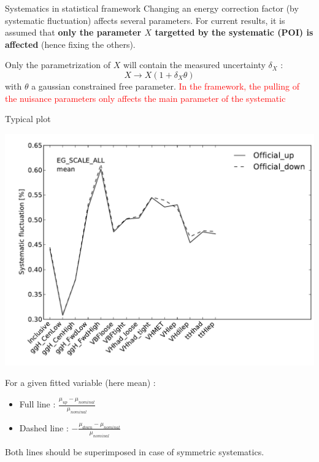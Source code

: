 \begin{frame}{Systematics in statistical framework}
  Changing an energy correction factor (by systematic fluctuation) affects several parameters.
  For current results, it is assumed that {\bf only the parameter $X$ targetted by the systematic (POI) is affected} (hence fixing the others).

  Only the parametrization of $X$ will contain the measured uncertainty $\delta_X$ :
  $$X\rightarrow X(1+\delta_X\theta)$$
  with $\theta$ a gaussian constrained free parameter.
  \vfill
  \textcolor{red}{In the framework, the pulling of the nuisance parameters only affects the main parameter of the systematic}
\end{frame}

\begin{frame}{Typical plot}
  \begin{minipage}{0.49\linewidth}
    \includegraphics[width=\linewidth]{plots/Backup/h013_ICHEP_PhotonSyst_EG_SCALE_ALL_mean.pdf}\\
  \end{minipage}
  \begin{minipage}{0.49\linewidth}
    For a given fitted variable (here mean) :
    \begin{itemize}
    \item Full line : $\frac{\mu_{up}-\mu_{nominal}}{\mu_{nominal}}$
    \item Dashed line : $-\frac{\mu_{down}-\mu_{nominal}}{\mu_{nominal}}$
 
    \end{itemize}
  \end{minipage}

  Both lines should be superimposed in case of symmetric systematics.
  \end{frame}
